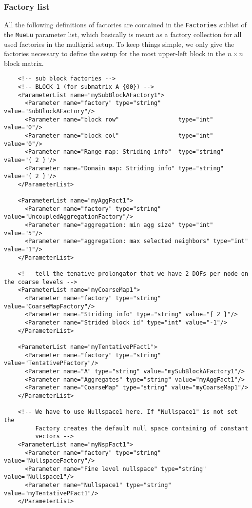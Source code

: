 \documentclass[10pt,fleqn]{book}
\begin{document}
\subsubsection{Factory list}
All the following definitions of factories are contained in the \texttt{Factories} sublist of the \texttt{MueLu} parameter list, which basically is meant as a factory collection for all used factories in the multigrid setup.
To keep things simple, we only give the factories necessary to define the setup for the most upper-left block in the $n\times n$ block matrix.

\begin{lstlisting}
    <!-- sub block factories -->
    <!-- BLOCK 1 (for submatrix A_{00}) -->
    <ParameterList name="mySubBlockAFactory1">
      <Parameter name="factory" type="string" value="SubBlockAFactory"/>
      <Parameter name="block row"                 type="int"     value="0"/>
      <Parameter name="block col"                 type="int"     value="0"/>
      <Parameter name="Range map: Striding info"  type="string"  value="{ 2 }"/>
      <Parameter name="Domain map: Striding info" type="string"  value="{ 2 }"/>
    </ParameterList>

    <ParameterList name="myAggFact1">
      <Parameter name="factory" type="string" value="UncoupledAggregationFactory"/>
      <Parameter name="aggregation: min agg size" type="int" value="5"/>
      <Parameter name="aggregation: max selected neighbors" type="int" value="1"/>
    </ParameterList>

    <!-- tell the tenative prolongator that we have 2 DOFs per node on the coarse levels -->
    <ParameterList name="myCoarseMap1">
      <Parameter name="factory" type="string" value="CoarseMapFactory"/>
      <Parameter name="Striding info" type="string" value="{ 2 }"/>
      <Parameter name="Strided block id" type="int" value="-1"/>
    </ParameterList>

    <ParameterList name="myTentativePFact1">
      <Parameter name="factory" type="string" value="TentativePFactory"/>
      <Parameter name="A" type="string" value="mySubBlockAFactory1"/>
      <Parameter name="Aggregates" type="string" value="myAggFact1"/>
      <Parameter name="CoarseMap" type="string" value="myCoarseMap1"/>
    </ParameterList>

    <!-- We have to use Nullspace1 here. If "Nullspace1" is not set the 
         Factory creates the default null space containing of constant 
         vectors -->
    <ParameterList name="myNspFact1">
      <Parameter name="factory" type="string" value="NullspaceFactory"/>
      <Parameter name="Fine level nullspace" type="string" value="Nullspace1"/>
      <Parameter name="Nullspace1" type="string" value="myTentativePFact1"/>
    </ParameterList>
\end{lstlisting}
\end{document}
